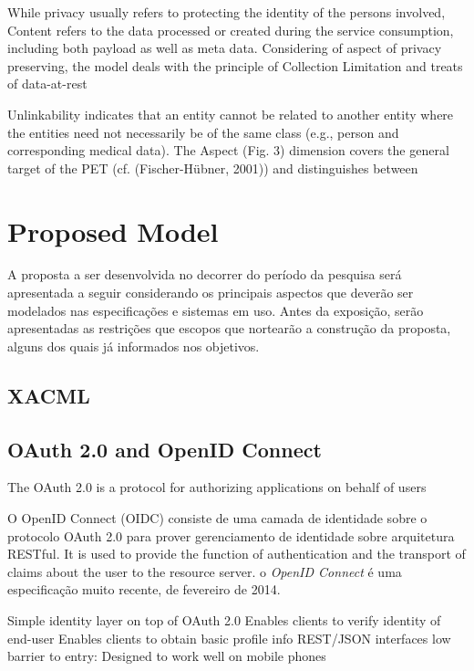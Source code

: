 \documentclass{doublecol-new}
\begin{document}
While privacy usually refers to protecting the identity of the persons involved, Content refers to the data processed or created during the service consumption, including both payload as well as meta data. \citep{heurix2015taxonomy}
Considering of aspect of privacy preserving, the model deals with the principle of Collection Limitation \citep{oecd2013guidelinesupdated} and treats of data-at-rest \citep{liu2010data}

Unlinkability indicates that an entity cannot be related to
another entity where the entities need not necessarily be of
the same class (e.g., person and corresponding medical data).
The Aspect (Fig. 3) dimension covers the general target of the
PET (cf. (Fischer-Hübner, 2001)) and distinguishes between




\section{Proposed Model}
A proposta a ser desenvolvida no decorrer do período da pesquisa será apresentada a seguir considerando os principais aspectos que deverão ser modelados nas especificações e sistemas em uso. Antes da exposição, serão apresentadas as restrições que escopos que nortearão a construção da proposta, alguns dos quais já informados nos objetivos.

\subsection[sec:xacml]{XACML}




\subsection[sec:oauthoidc]{OAuth 2.0 and OpenID Connect}


The OAuth 2.0 is a protocol for authorizing applications on behalf of users

O OpenID Connect (OIDC) consiste de uma camada de identidade sobre o protocolo OAuth 2.0 para prover gerenciamento de identidade sobre arquitetura RESTful. It is used to provide the function of authentication and the transport of claims about the user to the resource server. o \textit{OpenID Connect} é uma especificação muito recente, de fevereiro de 2014.

Simple identity layer on top of OAuth 2.0
Enables clients to verify identity of end-user
Enables clients to obtain basic profile info
REST/JSON interfaces low barrier to entry: Designed to work well on
mobile phones
\end{document}
